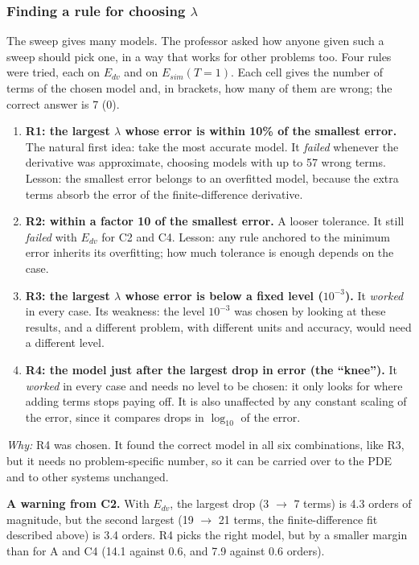 \documentclass[11pt,a4paper]{article}
\newcommand{\why}{\textit{Why:} }
\begin{document}
\subsubsection{Finding a rule for choosing $\lambda$}
The sweep gives many models. The professor asked how anyone given such a sweep should pick one, in a way that works for other problems too. Four rules were tried, each on $E_{dv}$ and on $E_{sim}(T{=}1)$. Each cell gives the number of terms of the chosen model and, in brackets, how many of them are wrong; the correct answer is 7 (0).
\begin{table}[H]\centering\small

\caption{Terms (wrong terms) of the model picked by each rule.}
\end{table}
\begin{enumerate}
  \item \textbf{R1: the largest $\lambda$ whose error is within 10\% of the smallest error.} The natural first idea: take the most accurate model. It \emph{failed} whenever the derivative was approximate, choosing models with up to 57 wrong terms. Lesson: the smallest error belongs to an overfitted model, because the extra terms absorb the error of the finite-difference derivative.
  \item \textbf{R2: within a factor 10 of the smallest error.} A looser tolerance. It still \emph{failed} with $E_{dv}$ for C2 and C4. Lesson: any rule anchored to the minimum error inherits its overfitting; how much tolerance is enough depends on the case.
  \item \textbf{R3: the largest $\lambda$ whose error is below a fixed level ($10^{-3}$).} It \emph{worked} in every case. Its weakness: the level $10^{-3}$ was chosen by looking at these results, and a different problem, with different units and accuracy, would need a different level.
  \item \textbf{R4: the model just after the largest drop in error (the ``knee'').} It \emph{worked} in every case and needs no level to be chosen: it only looks for where adding terms stops paying off. It is also unaffected by any constant scaling of the error, since it compares drops in $\log_{10}$ of the error.
\end{enumerate}
\why R4 was chosen. It found the correct model in all six combinations, like R3, but it needs no problem-specific number, so it can be carried over to the PDE and to other systems unchanged.

\textbf{A warning from C2.} With $E_{dv}$, the largest drop (3 $\to$ 7 terms) is 4.3 orders of magnitude, but the second largest (19 $\to$ 21 terms, the finite-difference fit described above) is 3.4 orders. R4 picks the right model, but by a smaller margin than for A and C4 (14.1 against 0.6, and 7.9 against 0.6 orders).
\end{document}
